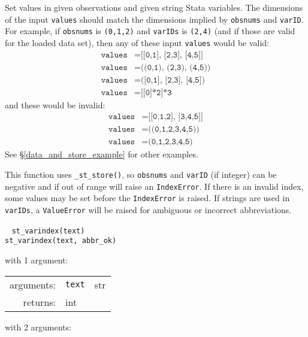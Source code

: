 \documentclass{article}
\begin{document}
			\vspace{1.5mm}
			\noindent Set values in given observations and given string Stata variables. The dimensions of the input \lstinline{values} should match the dimensions implied by \lstinline{obsnums} and \lstinline{varID}. For example, if \lstinline{obsnums} is \lstinline{(0,1,2)} and \lstinline{varIDs} is \lstinline{(2,4)} (and if those are valid for the loaded data set), then any of these input \lstinline{values} would be valid:
			\begin{align*}
				\texttt{values} &= \texttt{[[0,1], [2,3], [4,5]]} \\
				\texttt{values} &= \texttt{((0,1), (2,3), (4,5))} \\
				\texttt{values} &= \texttt{([0,1], [2,3], [4,5])} \\
				\texttt{values} &= \texttt{[[0]*2]*3}
			\end{align*}
			and these would be invalid:
			\begin{align*}
				\texttt{values} &= \texttt{[[0,1,2], [3,4,5]]} \\
				\texttt{values} &= \texttt{((0,1,2,3,4,5))} \\
				\texttt{values} &= \texttt{(0,1,2,3,4,5)}
			\end{align*}
See \S\ref{data_and_store_example} for other examples. 
			
			This function uses \lstinline{_st_store()}, so \lstinline{obsnums} and \lstinline{varID} (if integer) can be negative and if out of range will raise an \lstinline{IndexError}. If there is an invalid index, some values may be set before the \lstinline{IndexError} is raised. If strings are used in \lstinline{varIDs}, a \lstinline{ValueError} will be raised for ambiguous or incorrect abbreviations. \newline
			
			
			\ \newline
			\noindent \lstinline$st_varindex(text)$ \\
			\noindent \lstinline$st_varindex(text, abbr_ok)$
								
			\vspace{1.5mm}
			\noindent 
			\indent with 1 argument:
			
			\indent \qquad \begin{tabular}{rrl}
					arguments: & \texttt{text} & str \\
					returns: & \multicolumn{2}{l}{int}
				\end{tabular}
								
			\vspace{1.5mm}
			\noindent 
			\indent with 2 arguments:
			
\end{document}
